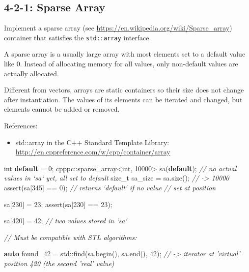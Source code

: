 \documentclass[]{article}
\newenvironment{Shaded}{}{}
\newcommand{\KeywordTok}[1]{\textcolor[rgb]{0.00,0.44,0.13}{\textbf{{#1}}}}
\newcommand{\DataTypeTok}[1]{\textcolor[rgb]{0.56,0.13,0.00}{{#1}}}
\newcommand{\DecValTok}[1]{\textcolor[rgb]{0.25,0.63,0.44}{{#1}}}
\newcommand{\CommentTok}[1]{\textcolor[rgb]{0.38,0.63,0.69}{\textit{{#1}}}}
\newcommand{\NormalTok}[1]{{#1}}
\providecommand{\tightlist}{%
  \setlength{\itemsep}{0pt}\setlength{\parskip}{0pt}}
\begin{document}
\subsection{4-2-1: Sparse Array}\label{sparse-array}
Implement a sparse array (see
\url{https://en.wikipedia.org/wiki/Sparse_array}) container that
satisfies the \texttt{std::array} interface.

A sparse array is a usually large array with most elements set to a
default value like 0. Instead of allocating memory for all values, only
non-default values are actually allocated.

Different from vectors, arrays are static containers so their size does
not change after instantiation. The values of its elements can be
iterated and changed, but elements cannot be added or removed.

References:

\begin{itemize}
\tightlist
\item
  std::array in the C++ Standard Template Library:
  \url{http://en.cppreference.com/w/cpp/container/array}
\end{itemize}

\begin{Shaded}
\begin{Highlighting}[]
\DataTypeTok{int} \KeywordTok{default} \NormalTok{= }\DecValTok{0}\NormalTok{;}
\NormalTok{cpppc::sparse_array<}\DataTypeTok{int}\NormalTok{, }\DecValTok{10000}\NormalTok{> sa(}\KeywordTok{default}\NormalTok{);}
\CommentTok{// no actual values in `sa` yet, all set to default}
\NormalTok{size_t sa_size = sa.size(); }\CommentTok{// -> 10000}
\NormalTok{assert(sa[}\DecValTok{345}\NormalTok{] == }\DecValTok{0}\NormalTok{);       }\CommentTok{// returns `default` if no value}
                            \CommentTok{// set at position}

\NormalTok{sa[}\DecValTok{230}\NormalTok{] = }\DecValTok{23}\NormalTok{;}
\NormalTok{assert(sa[}\DecValTok{230}\NormalTok{] == }\DecValTok{23}\NormalTok{);}

\NormalTok{sa[}\DecValTok{420}\NormalTok{] = }\DecValTok{42}\NormalTok{;}
\CommentTok{// two values stored in `sa`}

\CommentTok{// Must be compatible with STL algorithms:}

\KeywordTok{auto} \NormalTok{found_42 = std::find(sa.begin(), sa.end(), }\DecValTok{42}\NormalTok{);}
\CommentTok{// -> iterator at 'virtual' position 420 (the second 'real' value)}
\end{Highlighting}
\end{Shaded}
\end{document}

